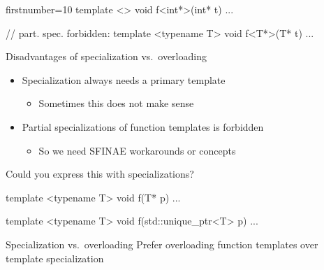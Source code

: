 \begin{advanced}
\begin{frame}[fragile]
\begin{multicols}{2}
\begin{cppcode*}{firstnumber=10}
      template <>
      void f<int*>(int* t) { ... }

      // part. spec. forbidden:
      template <typename T>
      void f<T*>(T* t) {...}
    \end{cppcode*}
  \end{multicols}
\end{frame}

\begin{frame}[fragile]
  \begin{block}{Disadvantages of specialization vs.\ overloading}
    \begin{itemize}
      \item Specialization always needs a primary template
      \begin{itemize}
        \item Sometimes this does not make sense
      \end{itemize}
      \item Partial specializations of function templates is forbidden
      \begin{itemize}
        \item So we need SFINAE workarounds or concepts
      \end{itemize}
    \end{itemize}
  \end{block}
  \small
  \begin{block}{Could you express this with specializations?}
    \begin{cppcode}
      template <typename T>
      void f(T* p) { ... }

      template <typename T>
      void f(std::unique_ptr<T> p) { ... }
    \end{cppcode}
  \end{block}
  \begin{goodpractice}{Specialization vs.\ overloading}
    Prefer overloading function templates over template specialization
  \end{goodpractice}
\end{frame}


\end{advanced}
